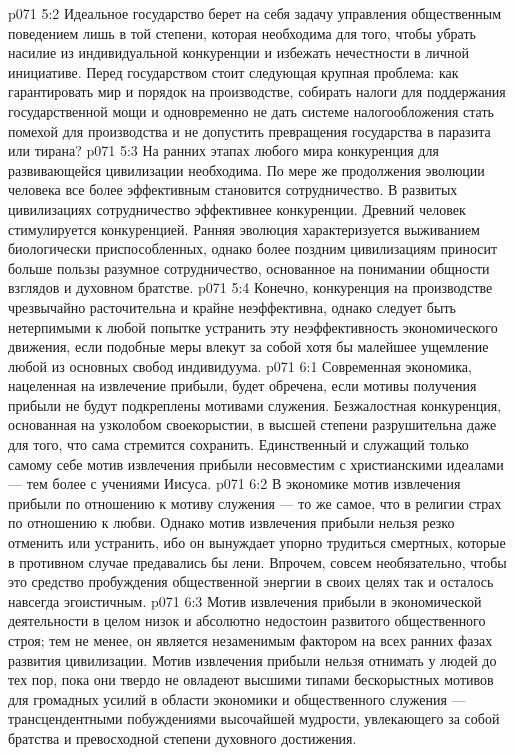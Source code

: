 \vs p071 5:2 Идеальное государство берет на себя задачу управления общественным поведением лишь в той степени, которая необходима для того, чтобы убрать насилие из индивидуальной конкуренции и избежать нечестности в личной инициативе. Перед государством стоит следующая крупная проблема: как гарантировать мир и порядок на производстве, собирать налоги для поддержания государственной мощи и одновременно не дать системе налогообложения стать помехой для производства и не допустить превращения государства в паразита или тирана?
\vs p071 5:3 На ранних этапах любого мира конкуренция для развивающейся цивилизации необходима. По мере же продолжения эволюции человека все более эффективным становится сотрудничество. В развитых цивилизациях сотрудничество эффективнее конкуренции. Древний человек стимулируется конкуренцией. Ранняя эволюция характеризуется выживанием биологически приспособленных, однако более поздним цивилизациям приносит больше пользы разумное сотрудничество, основанное на понимании общности взглядов и духовном братстве.
\vs p071 5:4 Конечно, конкуренция на производстве чрезвычайно расточительна и крайне неэффективна, однако следует быть нетерпимыми к любой попытке устранить эту неэффективность экономического движения, если подобные меры влекут за собой хотя бы малейшее ущемление любой из основных свобод индивидуума.
\vs p071 6:1 Современная экономика, нацеленная на извлечение прибыли, будет обречена, если мотивы получения прибыли не будут подкреплены мотивами служения. Безжалостная конкуренция, основанная на узколобом своекорыстии, в высшей степени разрушительна даже для того, что сама стремится сохранить. Единственный и служащий только самому себе мотив извлечения прибыли несовместим с христианскими идеалами --- тем более с учениями Иисуса.
\vs p071 6:2 В экономике мотив извлечения прибыли по отношению к мотиву служения --- то же самое, что в религии страх по отношению к любви. Однако мотив извлечения прибыли нельзя резко отменить или устранить, ибо он вынуждает упорно трудиться смертных, которые в противном случае предавались бы лени. Впрочем, совсем необязательно, чтобы это средство пробуждения общественной энергии в своих целях так и осталось навсегда эгоистичным.
\vs p071 6:3 Мотив извлечения прибыли в экономической деятельности в целом низок и абсолютно недостоин развитого общественного строя; тем не менее, он является незаменимым фактором на всех ранних фазах развития цивилизации. Мотив извлечения прибыли нельзя отнимать у людей до тех пор, пока они твердо не овладеют высшими типами бескорыстных мотивов для громадных усилий в области экономики и общественного служения --- трансцендентными побуждениями высочайшей мудрости, увлекающего за собой братства и превосходной степени духовного достижения.
